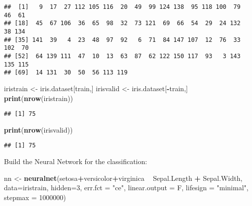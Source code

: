 \documentclass[]{article}
\newenvironment{Shaded}{\begin{snugshade}}{\end{snugshade}}
\newcommand{\DataTypeTok}[1]{\textcolor[rgb]{0.13,0.29,0.53}{#1}}
\newcommand{\DecValTok}[1]{\textcolor[rgb]{0.00,0.00,0.81}{#1}}
\newcommand{\KeywordTok}[1]{\textcolor[rgb]{0.13,0.29,0.53}{\textbf{#1}}}
\newcommand{\NormalTok}[1]{#1}
\newcommand{\OperatorTok}[1]{\textcolor[rgb]{0.81,0.36,0.00}{\textbf{#1}}}
\newcommand{\StringTok}[1]{\textcolor[rgb]{0.31,0.60,0.02}{#1}}
\begin{document}
\begin{verbatim}
##  [1]   9  17  27 112 105 116  20  49  99 124 138  95 118 100  79  46  61
## [18]  45  67 106  36  65  98  32  73 121  69  66  54  29  24 132  38 134
## [35] 141  39   4  23  48  97  92   6  71  84 147 107  12  76  33 102  70
## [52]  64 139 111  47  10  13  63  87  62 122 150 117  93   3 143 135 115
## [69]  14 131  30  50  56 113 119
\end{verbatim}

\begin{Shaded}
\begin{Highlighting}[]
\NormalTok{iristrain <-}\StringTok{ }\NormalTok{iris.dataset[train,]}
\NormalTok{irisvalid <-}\StringTok{ }\NormalTok{iris.dataset[}\OperatorTok{-}\NormalTok{train,]}
\KeywordTok{print}\NormalTok{(}\KeywordTok{nrow}\NormalTok{(iristrain))}
\end{Highlighting}
\end{Shaded}

\begin{verbatim}
## [1] 75
\end{verbatim}

\begin{Shaded}
\begin{Highlighting}[]
\KeywordTok{print}\NormalTok{(}\KeywordTok{nrow}\NormalTok{(irisvalid))}
\end{Highlighting}
\end{Shaded}

\begin{verbatim}
## [1] 75
\end{verbatim}

Build the Neural Network for the classification:

\begin{Shaded}
\begin{Highlighting}[]
\NormalTok{nn <-}\StringTok{ }\KeywordTok{neuralnet}\NormalTok{(setosa}\OperatorTok{+}\NormalTok{versicolor}\OperatorTok{+}\NormalTok{virginica }\OperatorTok{~}\StringTok{ }\NormalTok{Sepal.Length }\OperatorTok{+}\StringTok{ }\NormalTok{Sepal.Width, }\DataTypeTok{data=}\NormalTok{iristrain, }\DataTypeTok{hidden=}\DecValTok{3}\NormalTok{, }
                \DataTypeTok{err.fct =} \StringTok{"ce"}\NormalTok{, }\DataTypeTok{linear.output =}\NormalTok{ F, }\DataTypeTok{lifesign =} \StringTok{"minimal"}\NormalTok{, }\DataTypeTok{stepmax =} \DecValTok{1000000}\NormalTok{)}
\end{Highlighting}
\end{Shaded}
\end{document}
